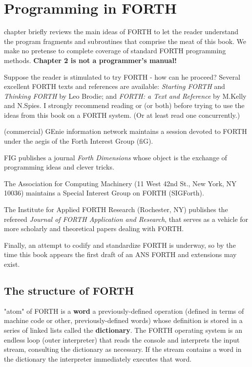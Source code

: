 ﻿%

\chapter{Programming in FORTH}

 chapter briefly reviews the main ideas of FORTH to let the reader understand the program fragments and subroutines that comprise the meat of this book. We make no pretense to complete coverage of standard FORTH programming methods. \textbf{Chapter 2 is not a programmer’s manual!}

Suppose the reader is stimulated to try FORTH - how can he proceed? Several excellent FORTH texts and references are available: \textit{Starting FORTH}  and \textit{Thinking FORTH}  by Leo Brodie; and \textit{ FORTH: a Text and Reference}  by M.Kelly and N.Spies. I strongly recommend reading \FTR or \SF (or both) before trying to use the ideas from this book on a FORTH system. (Or at least read one concurrently.)

 (commercial) GEnie information network maintains a session devoted to FORTH under the aegis of the Forth Interest Group (fiG).

FIG publishes a journal \textit{Forth Dimensions} whose object is the exchange of programming ideas and clever tricks.

The Association for Computing Machinery (11 West 42nd St., New York, NY 10036) maintains a Special Interest Group on FORTH (SIGForth).

The Institute for Applied FORTH Research (Rochester, NY) publishes the refereed \textit{Journal of FORTH Application and Research}, that serves as a vehicle for more scholarly and theoretical papers dealing with FORTH.

Finally, an attempt to codify and standardize FORTH is underway, so by the time this book appears the first draft of an ANS FORTH and extensions may exist.

\section{The structure of FORTH}

 "atom" of FORTH is a \textbf{word} a previously-defined operation (defined in terms of machine code or other, previously-defined words) whose definition is stored in a series of linked lists called the \textbf{dictionary}. The FORTH operating system is an endless loop (outer interpreter) that reads the console and interprets the input stream, consulting the dictionary as necessary. If the stream contains a word in the dictionary the interpreter immediately executes that word.


